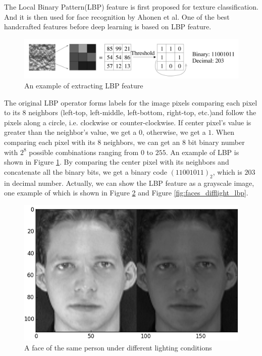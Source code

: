 \documentclass[paper=a4, fontsize=11pt]{scrartcl} %
\numberwithin{equation}{section} %
\numberwithin{figure}{section} %
\numberwithin{table}{section} %
\begin{document}
The Local Binary Pattern(LBP) feature is first proposed for texture classification\cite{ojala1996comparative}. And it is then used for face recognition by Ahonen et al\cite{ahonen2006face}. One of the best handcrafted features before deep learning is based on LBP feature\cite{chen2013blessing}.

\begin{figure}[!htbp]
	\centering
	\includegraphics[width=6in]{lbp.png}
	\caption{An example of extracting LBP feature}
	\label{fig:lbp}
\end{figure}

The original LBP operator forms labels for the image pixels comparing each pixel to its 8 neighbors (left-top, left-middle, left-bottom, right-top, etc.)and follow the pixels along a circle, i.e. clockwise or counter-clockwise. If center pixel's value is greater than the neighbor's value, we get a $0$, otherwise, we get a $1$. When comparing each pixel with its 8 neighbors, we can get an 8 bit binary number with $2^8$ possible combinations ranging from $0$ to $255$. An example of LBP is shown in Figure \ref{fig:lbp}. By comparing the center pixel with its neighbors and concatenate all the binary bits, we get a binary code $(11001011)_2$, which is $203$ in decimal number. Actually, we can show the LBP feature as a grayscale image, one example of which is shown in Figure \ref{fig:faces_difflight} and Figure \ref{fig:faces_difflight_lbp}.

\begin{figure}[htbp]
	\centering
	\includegraphics[width=5in]{faces_difflight.png}
	\caption{A face of the same person under different lighting conditions}
	\label{fig:faces_difflight}
\end{figure}
\end{document}
